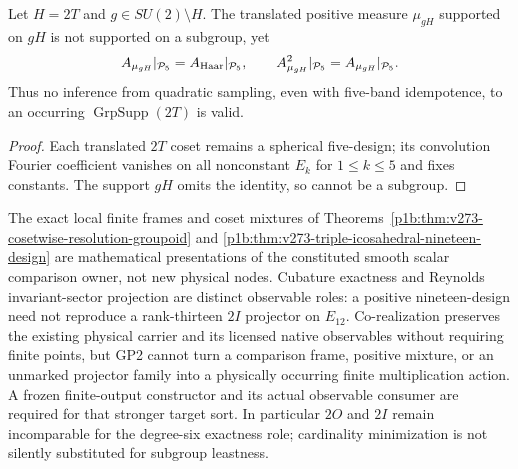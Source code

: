 \documentclass[12pt,a4paper]{article}
\begin{document}
\begin{proposition}
\label{p2a:prop:v273-finite-band-repeatability-countermodel}
Let $H=2T$ and $g\in SU(2)\setminus H$.
The translated positive measure $\mu_{gH}$ supported on $gH$
is not supported on a subgroup, yet
\[
 A_{\mu_{gH}}|_{\mathcal P_5}
 =A_{\rm Haar}|_{\mathcal P_5},\qquad
 A_{\mu_{gH}}^2|_{\mathcal P_5}=A_{\mu_{gH}}|_{\mathcal P_5}.
\]
Thus no inference from quadratic sampling, even with five-band
idempotence, to an occurring $\operatorname{GrpSupp}(2T)$ is valid.
\end{proposition}
\begin{proof}
Each translated $2T$ coset remains a spherical five-design;
its convolution Fourier coefficient vanishes on all nonconstant
$E_k$ for $1\le k\le5$ and fixes constants. The support
$gH$ omits the identity, so cannot be a subgroup.
\end{proof}

\begin{remark}
\label{p2a:rem:v273-superposition-consumer-firewall}
The exact local finite frames and coset mixtures of
Theorems~\ref{p1b:thm:v273-cosetwise-resolution-groupoid} and
\ref{p1b:thm:v273-triple-icosahedral-nineteen-design}
are mathematical presentations of the constituted smooth scalar
comparison owner, not new physical nodes. Cubature exactness and
Reynolds invariant-sector projection are distinct observable roles:
a positive nineteen-design need not reproduce a rank-thirteen
$2I$ projector on $E_{12}$. Co-realization preserves the existing
physical carrier and its licensed native observables without
requiring finite points, but GP2 cannot turn a comparison frame,
positive mixture, or an unmarked projector family into a physically
occurring finite multiplication action. A frozen finite-output
constructor and its actual observable consumer are required for
that stronger target sort. In particular $2O$ and $2I$ remain
incomparable for the degree-six exactness role; cardinality
minimization is not silently substituted for subgroup leastness.
\end{remark}
\end{document}
